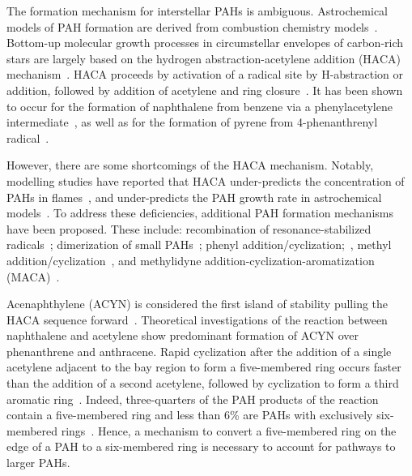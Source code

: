 \documentclass[journal=jacsat,manuscript=article,layout=onecolumn]{achemso}
\begin{document}

The formation mechanism for interstellar PAHs is ambiguous. Astrochemical models of PAH formation are derived from combustion chemistry models~\cite{fre89}. Bottom-up molecular growth processes in circumstellar envelopes of carbon-rich stars are largely based on the hydrogen abstraction-acetylene addition (HACA) mechanism~\cite{tie13}. HACA proceeds by activation of a radical site by H-abstraction or addition, followed by addition of acetylene and ring closure~\cite{fre85}.  It has been shown to occur for the formation of naphthalene from benzene via a phenylacetylene intermediate~\cite{par14,yan16}, as well as for the formation of pyrene from 4-phenanthrenyl radical~\cite{zha18}.

However, there are some shortcomings of the HACA mechanism. Notably, modelling studies have reported that HACA under-predicts the concentration of PAHs in flames~\cite{raj12}, and under-predicts the PAH growth rate in astrochemical models~\cite{mic10a,mic10b,mic11}. To address these deficiencies, additional PAH formation mechanisms have been proposed. These include: recombination of resonance-stabilized radicals~\cite{mel96,mil92,joh18}; dimerization of small PAHs~\cite{sie00}; phenyl addition/cyclization;~\cite{shu08}, methyl addition/cyclization~\cite{shu10}, and methylidyne addition-cyclization-aromatization (MACA)~\cite{dod21}. %

Acenaphthylene (ACYN) is considered the first island of stability pulling the HACA sequence forward~\cite{fre20}. Theoretical investigations of the reaction between naphthalene and acetylene show predominant formation of ACYN over phenanthrene and anthracene. Rapid cyclization after the addition of a single acetylene adjacent to the bay region to form a five-membered ring occurs faster than the addition of a second acetylene, followed by cyclization to form a third aromatic ring~\cite{kis13}. Indeed, three-quarters of the PAH products of the reaction contain a five-membered ring and less than 6\% are PAHs with exclusively six-membered rings~\cite{kis13}. Hence, a mechanism to convert a five-membered ring on the edge of a PAH to a six-membered ring is necessary to account for pathways to larger PAHs. %
\end{document}
